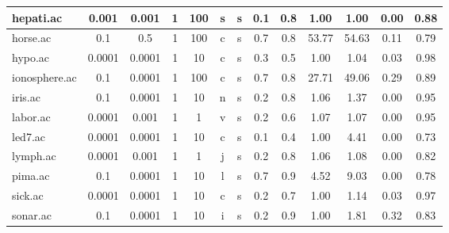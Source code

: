 \begin{table}[htbp]
\begin{tabular}{|l|c|c|c|c|c|c|c|c||c|c|c|c|}
		\hline
		hepati.ac      & 0.001    & 0.001       & 1              & 100      & s                   & s        & 0.1    & 0.8   & 1.00           & 1.00           & 0.00           & 0.88           \\
		\hline
		horse.ac       & 0.1      & 0.5         & 1              & 100      & c                   & s        & 0.7    & 0.8   & 53.77          & 54.63          & 0.11           & 0.79           \\
		\hline
		hypo.ac        & 0.0001   & 0.0001      & 1              & 10       & c                   & s        & 0.3    & 0.5   & 1.00           & 1.04           & 0.03           & 0.98           \\
		\hline
		ionosphere.ac  & 0.1      & 0.0001      & 1              & 100      & c                   & s        & 0.7    & 0.8   & 27.71          & 49.06          & 0.29           & 0.89           \\
		\hline
		iris.ac        & 0.1      & 0.0001      & 1              & 10       & n                   & s        & 0.2    & 0.8   & 1.06           & 1.37           & 0.00           & 0.95           \\
		\hline
		labor.ac       & 0.0001   & 0.001       & 1              & 1        & v                   & s        & 0.2    & 0.6   & 1.07           & 1.07           & 0.00           & 0.95           \\
		\hline
		led7.ac        & 0.0001   & 0.0001      & 1              & 10       & c                   & s        & 0.1    & 0.4   & 1.00           & 4.41           & 0.00           & 0.73           \\
		\hline
		lymph.ac       & 0.0001   & 0.001       & 1              & 1        & j                   & s        & 0.2    & 0.8   & 1.06           & 1.08           & 0.00           & 0.82           \\
		\hline
		pima.ac        & 0.1      & 0.0001      & 1              & 10       & l                   & s        & 0.7    & 0.9   & 4.52           & 9.03           & 0.00           & 0.78           \\
		\hline
		sick.ac        & 0.0001   & 0.0001      & 1              & 10       & c                   & s        & 0.2    & 0.7   & 1.00           & 1.14           & 0.03           & 0.97           \\
		\hline
		sonar.ac       & 0.1      & 0.0001      & 1              & 10       & i                   & s        & 0.2    & 0.9   & 1.00           & 1.81           & 0.32           & 0.83           \\

\end{tabular}
\end{table}
